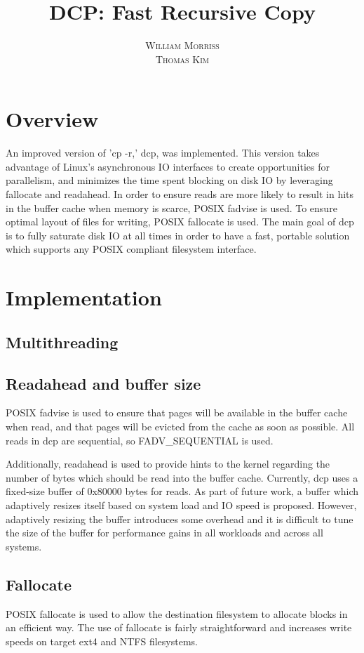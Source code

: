 \documentclass[12pt]{article}
\title{\vspace{-25mm}\fontsize{16pt}{10pt}\selectfont\textbf{DCP: Fast Recursive Copy}} %
\author{
  \textsc{William Morriss} \\
  \textsc{Thomas Kim}
}
\date{}
\begin{document}
\maketitle %

\section{Overview}
An improved version of 'cp -r,' dcp, was implemented.
This version takes advantage of Linux's asynchronous IO interfaces to create
opportunities for parallelism, and minimizes the time spent blocking on disk
IO by leveraging fallocate and readahead. In order to ensure reads
are more likely to result in hits in the buffer cache when memory is scarce, POSIX
fadvise is used. To ensure optimal layout of files for writing, POSIX
fallocate is used. The main goal of dcp is to fully saturate disk IO
at all times in order to have a fast, portable solution which supports
any POSIX compliant filesystem interface.

\section{Implementation}

\subsection{Multithreading}

\subsection{Readahead and buffer size}
POSIX fadvise is used to ensure that pages will be available
in the buffer cache when read, and that pages will be evicted from
the cache as soon as possible. All reads in dcp are
sequential, so FADV\_SEQUENTIAL is used.

Additionally, readahead is used to provide hints to the kernel
regarding the number of bytes which should be read into the buffer cache.
Currently, dcp uses a fixed-size buffer of 0x80000 bytes for reads.
As part of future work, a buffer which adaptively resizes itself based on system
load and IO speed is proposed. However, adaptively resizing the buffer introduces
some overhead and it is difficult to tune the size of the buffer for performance gains
in all workloads and across all systems. %

\subsection{Fallocate}
POSIX fallocate is used to allow the destination filesystem to
allocate blocks in an efficient way. The use of fallocate is
fairly straightforward and increases write speeds on
target ext4 and NTFS filesystems.
\end{document}
